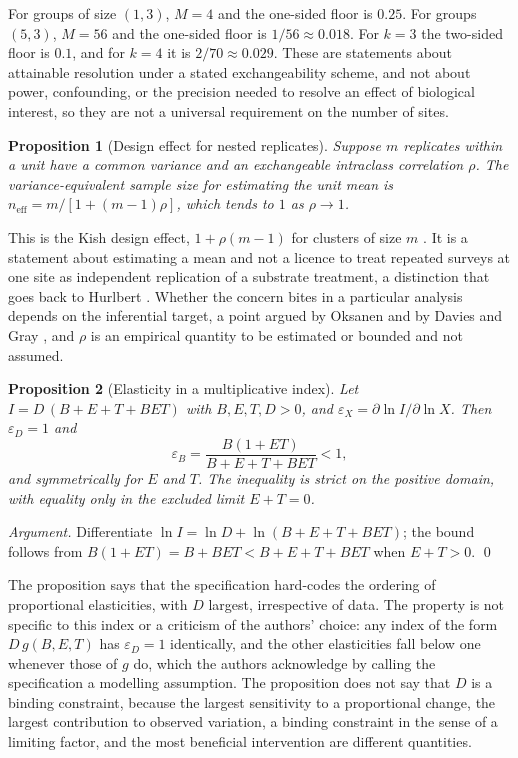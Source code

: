 \documentclass[11pt]{article}
\newtheorem{proposition}{Proposition}
\theoremstyle{definition}
\theoremstyle{remark}
\begin{document}
For groups of size $(1,3)$, $M=4$ and the one-sided floor is $0.25$. For groups $(5,3)$, $M=56$ and the one-sided floor is $1/56\approx0.018$. For $k=3$ the two-sided floor is $0.1$, and for $k=4$ it is $2/70\approx0.029$. These are statements about attainable resolution under a stated exchangeability scheme, and not about power, confounding, or the precision needed to resolve an effect of biological interest, so they are not a universal requirement on the number of sites.

\begin{proposition}[Design effect for nested replicates]\label{prop:kish}
Suppose $m$ replicates within a unit have a common variance and an exchangeable intraclass correlation $\rho$. The variance-equivalent sample size for estimating the unit mean is $n_{\mathrm{eff}}=m/[1+(m-1)\rho]$, which tends to $1$ as $\rho\to1$.
\end{proposition}

This is the Kish design effect, $1+\rho(m-1)$ for clusters of size $m$ \cite[Sec.~5.4]{kish1965}. It is a statement about estimating a mean and not a licence to treat repeated surveys at one site as independent replication of a substrate treatment, a distinction that goes back to Hurlbert \cite{hurlbert1984}. Whether the concern bites in a particular analysis depends on the inferential target, a point argued by Oksanen \cite{oksanen2001} and by Davies and Gray \cite{davies2015}, and $\rho$ is an empirical quantity to be estimated or bounded and not assumed.

\begin{proposition}[Elasticity in a multiplicative index]\label{prop:elast}
Let $I=D\,(B+E+T+BET)$ with $B,E,T,D>0$, and $\varepsilon_X=\partial\ln I/\partial\ln X$. Then $\varepsilon_D=1$ and
\[
\varepsilon_B=\frac{B(1+ET)}{B+E+T+BET}<1,
\]
and symmetrically for $E$ and $T$. The inequality is strict on the positive domain, with equality only in the excluded limit $E+T=0$.
\end{proposition}

\emph{Argument.} Differentiate $\ln I=\ln D+\ln(B+E+T+BET)$; the bound follows from $B(1+ET)=B+BET<B+E+T+BET$ when $E+T>0$. \qed

The proposition says that the specification hard-codes the ordering of proportional elasticities, with $D$ largest, irrespective of data. The property is not specific to this index or a criticism of the authors' choice: any index of the form $D\,g(B,E,T)$ has $\varepsilon_D=1$ identically, and the other elasticities fall below one whenever those of $g$ do, which the authors acknowledge by calling the specification a modelling assumption. The proposition does not say that $D$ is a binding constraint, because the largest sensitivity to a proportional change, the largest contribution to observed variation, a binding constraint in the sense of a limiting factor, and the most beneficial intervention are different quantities.
\end{document}
